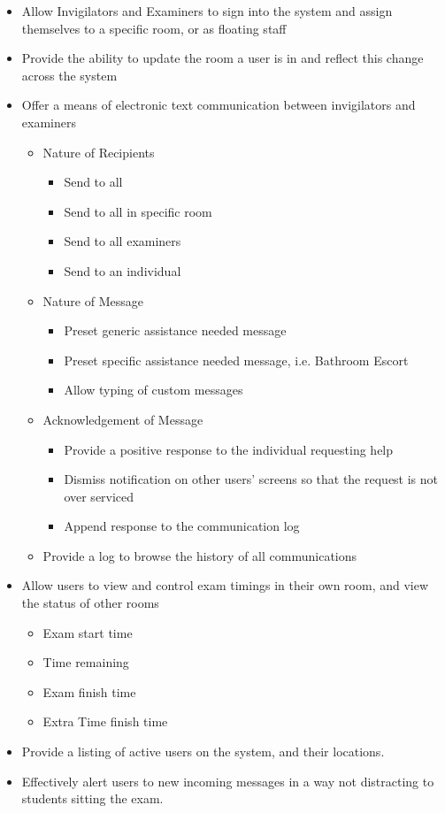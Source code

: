 \documentclass[a4paper, 12pt, notitlepage]{report}
\begin{document}
\begin{itemize}
\item Allow Invigilators and Examiners to sign into the system and assign themselves to a specific room, or as floating staff

\item Provide the ability to update the room a user is in and reflect this change across the system

\item Offer a means of electronic text communication between invigilators and examiners
\begin{itemize}
\item Nature of Recipients
\begin{itemize}
\item Send to all
\item Send to all in specific room
\item Send to all examiners
\item Send to an individual
\end{itemize}
\item Nature of Message
\begin{itemize}
\item Preset generic assistance needed message
\item Preset specific assistance needed message, i.e. Bathroom Escort
\item Allow typing of custom messages
\end{itemize}
\item Acknowledgement of Message
\begin{itemize}
\item Provide a positive response to the individual requesting help
\item Dismiss notification on other users' screens so that the request is not over serviced
\item Append response to the communication log
\end{itemize}
\item Provide a log to browse the history of all communications
\end{itemize}

\item Allow users to view and control exam timings in their own room, and view the status of other rooms
\begin{itemize}
\item Exam start time
\item Time remaining
\item Exam finish time
\item Extra Time finish time
\end{itemize}

\item Provide a listing of active users on the system, and their locations.

\item Effectively alert users to new incoming messages in a way not distracting to students sitting the exam.

\end{itemize}
\end{document}
